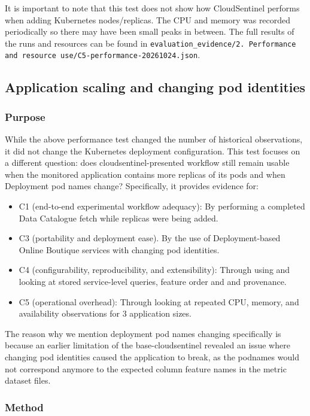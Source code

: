It is important to note that this test does not show how CloudSentinel performs when adding Kubernetes nodes/replicas. The CPU and memory was recorded periodically so there may have been small peaks in between. The full results of the runs and resources can be found in \texttt{evaluation\_evidence/2. Performance and resource use/C5-performance-20261024.json}.

\subsection{Application scaling and changing pod identities}

\subsubsection{Purpose}
While the above performance test changed the number of historical observations, it did not change the Kubernetes deployment configuration. This test focuses on a different question: does cloudsentinel-presented workflow still remain usable when the monitored application contains more replicas of its pods and when Deployment pod names change? Specifically, it provides evidence for:

\begin{itemize}
    \item C1 (end-to-end experimental workflow adequacy): By performing a completed Data Catalogue fetch while replicas were being added.
    \item C3 (portability and deployment ease). By the use of Deployment-based Online Boutique services with changing pod identities.
    \item C4 (configurability, reproducibility, and extensibility): Through using and looking at stored service-level queries, feature order and and  provenance.
    \item C5 (operational overhead): Through looking at repeated CPU, memory, and availability observations for 3 application sizes.
\end{itemize}

The reason why we mention deployment pod names changing specifically is because an earlier limitation of the base-cloudsentinel revealed an issue where changing pod identities caused the application to break, as the podnames would not correspond anymore to the expected column feature names in the metric dataset files.

\subsubsection{Method}

